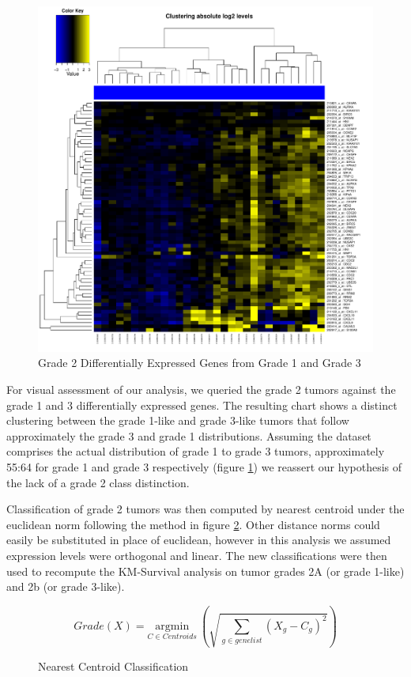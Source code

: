 \documentclass[a4paper,10pt]{article}
\begin{document}
\begin{figure}
\centering
\includegraphics[scale=0.38]{docs/grade2onupregulated3}
\caption{Grade 2 Differentially Expressed Genes from Grade 1 and Grade 3}\label{grade2up}
\end{figure}
For visual assessment of our analysis, we queried the grade 2 tumors against the grade 1 and 3 differentially expressed genes. The resulting chart
shows a distinct clustering between the grade 1-like and grade 3-like tumors that follow approximately 
the grade 3 and grade 1 distributions. Assuming the dataset comprises the actual distribution 
of grade 1 to grade 3 tumors, approximately 55:64 for grade 1 and grade 3 respectively (figure \ref{grade2up}) we reassert our hypothesis
of the lack of a grade 2 class distinction.

Classification of grade 2 tumors was then computed by nearest centroid under the euclidean norm following the method in figure \ref{classify}.
Other distance norms could easily be substituted in place of euclidean, however in this analysis we assumed expression levels were orthogonal
and linear. The new classifications were then used to recompute the KM-Survival analysis on tumor grades 2A (or grade 1-like) and 2b (or grade 3-like).
\begin{figure}
 $$
Grade(X) = \underset{C \in Centroids} {\mathrm{argmin}} ~ \left( \sqrt{\sum_{g\in genelist}{ (X_{g} - C_{g})^2}}\right)
$$
\caption{Nearest Centroid Classification}\label{classify}
\end{figure}
\end{document}
